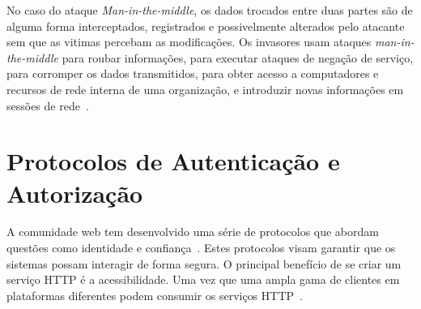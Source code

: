 No caso do ataque \emph{Man-in-the-middle}, os dados trocados entre duas partes são de alguma forma interceptados, registrados e possivelmente alterados pelo atacante sem que as vitimas percebam as modificações. Os invasores usam ataques \emph{man-in-the-middle} para roubar informações, para executar ataques de negação de serviço, para corromper os dados transmitidos, para obter acesso a computadores e recursos de rede interna de uma organização, e introduzir novas informações em sessões de rede~\cite{kim2010fundamentals}.






\section{Protocolos de Autenticação e Autorização}
A comunidade web tem desenvolvido uma série de protocolos que abordam questões como identidade e confiança~\cite{Webber10}. Estes protocolos visam garantir que os sistemas possam interagir de forma segura. O principal benefício de se criar um serviço HTTP é a acessibilidade. Uma vez que uma ampla gama de clientes em plataformas diferentes podem consumir os serviços HTTP~\cite{lakshmiraghavan2013pro}.

